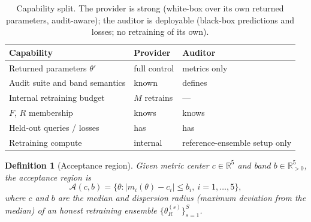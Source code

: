 \documentclass[lettersize,journal]{IEEEtran}
\newtheorem{definition}{Definition}
\begin{document}
\begin{table}[t]
\caption{Capability split. The provider is strong (white-box over its
own returned parameters, audit-aware); the auditor is deployable
(black-box predictions and losses; no retraining of its own).}
\label{tab:capabilities}
\centering
\small
\begin{tabular}{p{40mm}p{19mm}p{15mm}}
\toprule
Capability & Provider & Auditor \\
\midrule
Returned parameters $\theta'$ & full control & metrics only \\
Audit suite and band semantics & known & defines \\
Internal retraining budget & $M$ retrains & --- \\
$F$, $R$ membership & knows & knows \\
Held-out queries / losses & has & has \\
Retraining compute & internal & reference-ensemble setup only \\
\bottomrule
\end{tabular}
\end{table}

\begin{definition}[Acceptance region]
\label{def:region}
Given metric center $c \in \mathbb{R}^5$ and band $b \in
\mathbb{R}^5_{>0}$, the acceptance region is
\begin{equation}
\label{eq:region}
\mathcal{A}(c,b) = \bigl\{\theta : |m_i(\theta) - c_i| \le b_i,\
i = 1,\dots,5\bigr\},
\end{equation}
where $c$ and $b$ are the median and dispersion radius (maximum
deviation from the median) of an honest retraining ensemble
$\{\theta_R^{(s)}\}_{s=1}^{S}$.
\end{definition}
\end{document}
